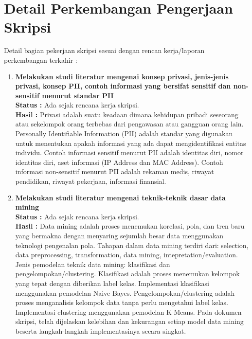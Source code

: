 \documentclass[a4paper,twoside]{article}
\begin{document}
\section{Detail Perkembangan Pengerjaan Skripsi}
Detail bagian pekerjaan skripsi sesuai dengan rencan kerja/laporan perkembangan terkahir :
	\begin{enumerate}
		\item \textbf{Melakukan studi literatur mengenai konsep privasi, jenis-jenis privasi, konsep PII, contoh informasi yang bersifat sensitif dan non-sensitif menurut standar PII}\\
		{\bf Status :} Ada sejak rencana kerja skripsi.\\
		{\bf Hasil :} Privasi adalah suatu keadaan dimana kehidupan pribadi seseorang atau sekelompok orang terbebas dari pengawasan atau gangguan orang lain. Personally Identifiable Information (PII) adalah standar yang digunakan untuk menentukan apakah informasi yang ada dapat mengidentifikasi entitas individu. Contoh informasi sensitif menurut PII adalah identitas diri, nomor identitas diri, aset informasi (IP Address dan MAC Address). Contoh informasi non-sensitif menurut PII adalah rekaman medis, riwayat pendidikan, riwayat pekerjaan, informasi finansial.

		\item \textbf{Melakukan studi literatur mengenai teknik-teknik dasar data mining}\\
		{\bf Status :} Ada sejak rencana kerja skripsi.\\
		{\bf Hasil :} Data mining adalah proses menemukan korelasi, pola, dan tren baru yang bermakna dengan menyaring sejumlah besar data menggunakan teknologi pengenalan pola. Tahapan dalam data mining terdiri dari: selection, data preprocessing, transformation, data mining, intepretation/evaluation. Jenis pemodelan teknik data mining: klasifikasi dan pengelompokan/clustering. Klasifikasi adalah proses menemukan kelompok yang tepat dengan diberikan label kelas. Implementasi klasifikasi menggunakan pemodelan Naive Bayes. Pengelompokan/clustering adalah proses menganalisis kelompok data tanpa perlu mengetahui label kelas.  Implementasi clustering menggunakan pemodelan K-Means. Pada dokumen skripsi, telah dijelaskan kelebihan dan kekurangan setiap model data mining beserta langkah-langkah implementasinya secara singkat.
		

\end{enumerate}
\end{document}
